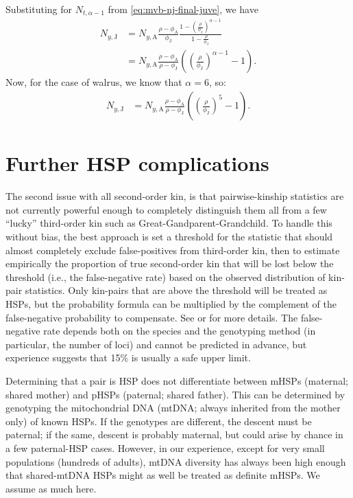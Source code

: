 Substituting for $N_{t,\alpha-1}$ from \eqref{eq:mvb-nj-final-juve},
we have
\begin{align*}
N_{y,\text{J}} & =N_{y,\text{A}}\frac{\rho-\phi_{\text{A}}}{\phi_{\text{J}}}\frac{1-\left(\frac{\rho}{\phi_{\text{J}}}\right)^{\alpha-1}}{1-\frac{\rho}{\phi_{\text{J}}}}\\
 & =N_{y,\text{A}}\frac{\rho-\phi_{\text{A}}}{\rho-\phi_{\text{J}}}\left(\left(\frac{\rho}{\phi_{\text{J}}}\right)^{\alpha-1}-1\right).
\end{align*}
Now, for the case of walrus, we know that $\alpha=6$, so:
\begin{align*}
N_{y,\text{J}} & =N_{y,\text{A}}\frac{\rho-\phi_{\text{A}}}{\rho-\phi_{\text{J}}}\left(\left(\frac{\rho}{\phi_{\text{J}}}\right)^{5}-1\right).
\end{align*}
\pagebreak{}

\section{Further HSP complications}

The second issue with all second-order kin, is that pairwise-kinship
statistics are not currently powerful enough to completely distinguish
them all from a few ``lucky'' third-order kin such as Great-Gandparent-Grandchild.
To handle this without bias, the best approach is set a threshold
for the statistic that should almost completely exclude false-positives
from third-order kin, then to estimate empirically the proportion
of true second-order kin that will be lost below the threshold (i.e.,
the false-negative rate) based on the observed distribution of kin-pair
statistics. Only kin-pairs that are above the threshold will be treated
as HSPs, but the probability formula can be multiplied by the complement
of the false-negative probability to compensate. See \citet{bravington_close-kin_2016}
or \citet{Hillary2018WS-CKMR} for more details. The false-negative
rate depends both on the species and the genotyping method (in particular,
the number of loci) and cannot be predicted in advance, but experience
suggests that 15\% is usually a safe upper limit.

Determining that a pair is HSP does not differentiate between mHSPs
(maternal; shared mother) and pHSPs (paternal; shared father). This
can be determined by genotyping the mitochondrial DNA (mtDNA; always
inherited from the mother only) of known HSPs. If the genotypes are
different, the descent must be paternal; if the same, descent is probably
maternal, but could arise by chance in a few paternal-HSP cases. However,
in our experience, except for very small populations (hundreds of
adults), mtDNA diversity has always been high enough that shared-mtDNA
HSPs might as well be treated as definite mHSPs. We assume as much
here.

